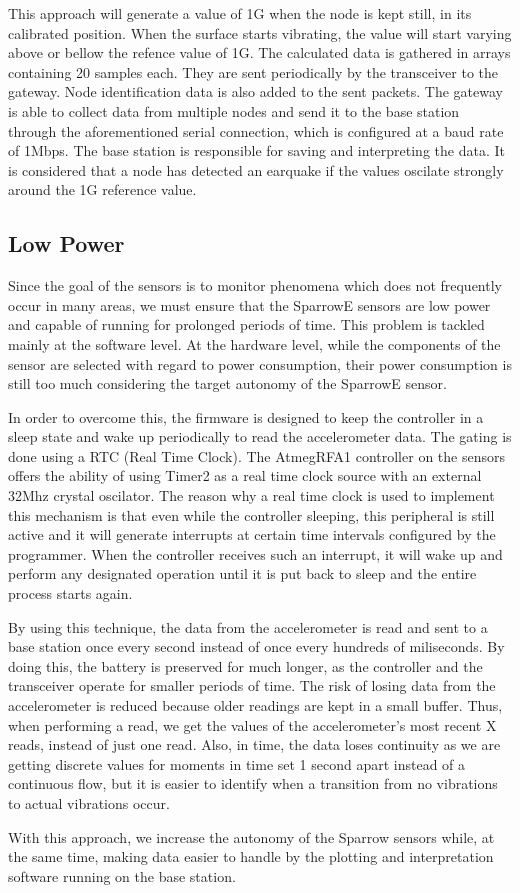 This approach will generate a value of 1G when the node is kept still, in its calibrated position. When the surface starts vibrating, the value will start varying 
above or bellow the refence value of 1G. The calculated data is gathered in arrays containing 20 samples each. They are sent periodically by the transceiver to the 
gateway. Node identification data is also added to the sent packets. The gateway is able to collect data from multiple nodes and send it to the base station through
the aforementioned serial connection, which is configured at a baud rate of 1Mbps. The base station is responsible for saving and interpreting the data. 
It is considered that a node has detected an earquake if the values oscilate strongly around the 1G reference value.


\subsection{Low Power}

Since the goal of the sensors is to monitor phenomena which does not frequently occur in many areas, we must ensure that the SparrowE sensors are low power and 
capable of running for prolonged periods of time. This problem is tackled mainly at the software level. At the hardware level, while the components of the sensor 
are selected with regard to power consumption, their power consumption is still too much considering the target autonomy of the SparrowE sensor.

In order to overcome this, the firmware is designed to keep the controller in a sleep state and wake up periodically to read the accelerometer data. 
The gating is done using a RTC (Real Time Clock). The AtmegRFA1 controller on the sensors offers the ability of using Timer2 as a real time clock source with an 
external 32Mhz crystal oscilator. The reason why a real time clock is used to implement this mechanism is that even while the controller sleeping, 
this peripheral is still active and it will generate interrupts at certain time intervals configured by the programmer. When the controller receives such an 
interrupt, it will wake up and perform any designated operation until it is put back to sleep and the entire process starts again.

By using this technique, the data from the accelerometer is read and sent to a base station once every second instead of once every hundreds of miliseconds. By doing this, 
the battery is preserved for much longer, as the controller and the transceiver operate for smaller periods of time. The risk of losing data from the accelerometer is reduced 
because older readings are kept in a small buffer. Thus, when performing a read, we get the values of the accelerometer's most recent X reads, instead of just one read. Also, 
in time, the data loses continuity as we are getting discrete values for moments in time set 1 second apart instead of a continuous flow, but it is easier to identify when 
a transition from no vibrations to actual vibrations occur.

With this approach, we increase the autonomy of the Sparrow sensors while, at the same time, making data easier to handle by the plotting and interpretation software running 
on the base station.
